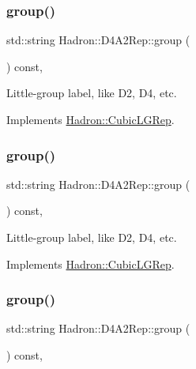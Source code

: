 \subsubsection{\texorpdfstring{group()}{group()}\hspace{0.1cm}{\footnotesize\ttfamily [3/5]}}
{\footnotesize\ttfamily std\+::string Hadron\+::\+D4\+A2\+Rep\+::group (\begin{DoxyParamCaption}{ }\end{DoxyParamCaption}) const\hspace{0.3cm}{\ttfamily [inline]}, {\ttfamily [virtual]}}

Little-\/group label, like D2, D4, etc. 

Implements \mbox{\hyperlink{structHadron_1_1CubicLGRep_a9bdb14b519a611d21379ed96a3a9eb41}{Hadron\+::\+Cubic\+L\+G\+Rep}}.

\mbox{\label{structHadron_1_1D4A2Rep_a4f1794198aaae635c3f2fa3816c36942}} 
\subsubsection{\texorpdfstring{group()}{group()}\hspace{0.1cm}{\footnotesize\ttfamily [4/5]}}
{\footnotesize\ttfamily std\+::string Hadron\+::\+D4\+A2\+Rep\+::group (\begin{DoxyParamCaption}{ }\end{DoxyParamCaption}) const\hspace{0.3cm}{\ttfamily [inline]}, {\ttfamily [virtual]}}

Little-\/group label, like D2, D4, etc. 

Implements \mbox{\hyperlink{structHadron_1_1CubicLGRep_a9bdb14b519a611d21379ed96a3a9eb41}{Hadron\+::\+Cubic\+L\+G\+Rep}}.

\mbox{\label{structHadron_1_1D4A2Rep_a4f1794198aaae635c3f2fa3816c36942}} 
\subsubsection{\texorpdfstring{group()}{group()}\hspace{0.1cm}{\footnotesize\ttfamily [5/5]}}
{\footnotesize\ttfamily std\+::string Hadron\+::\+D4\+A2\+Rep\+::group (\begin{DoxyParamCaption}{ }\end{DoxyParamCaption}) const\hspace{0.3cm}{\ttfamily [inline]}, {\ttfamily [virtual]}}

